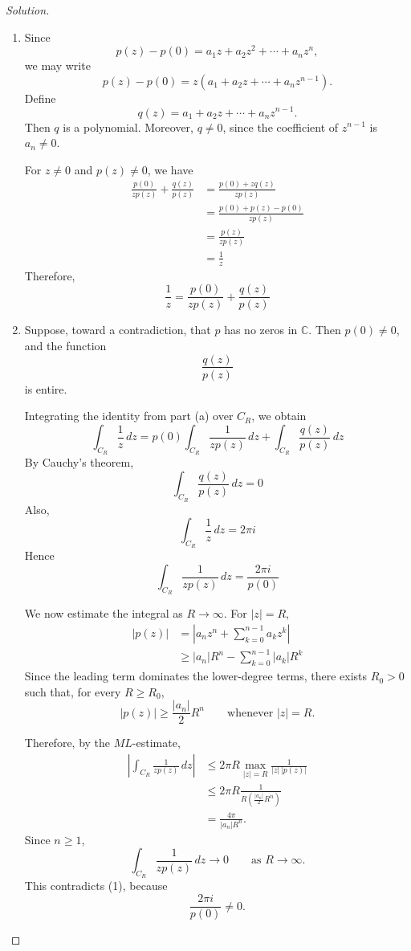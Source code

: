 \documentclass[12pt, a4paper]{report}
\theoremstyle{spaced}
\begin{document}
\begin{proof}[Solution]
	\begin{enumerate}
		\item[(a)]
			Since
			\[
				p(z)-p(0)
				=
				a_1z+a_2z^2+\cdots+a_nz^n,
			\]
			we may write
			\[
				p(z)-p(0)
				=
				z\left(a_1+a_2z+\cdots+a_nz^{n-1}\right).
			\]
			Define
			\[
				q(z)=a_1+a_2z+\cdots+a_nz^{n-1}.
			\]
			Then \(q\) is a polynomial. Moreover, \(q\neq 0\), since the
			coefficient of \(z^{n-1}\) is \(a_n\neq 0\).

			For \(z\neq 0\) and \(p(z)\neq 0\), we have
			\[
				\begin{aligned}
					\frac{p(0)}{zp(z)}+\frac{q(z)}{p(z)}
					 & =
					\frac{p(0)+zq(z)}{zp(z)}     \\
					 & =
					\frac{p(0)+p(z)-p(0)}{zp(z)} \\
					 & =
					\frac{p(z)}{zp(z)}           \\
					 & =
					\frac{1}{z}
				\end{aligned}
			\]
			Therefore,
			\[
				\frac{1}{z}
				=
				\frac{p(0)}{zp(z)}
				+
				\frac{q(z)}{p(z)}
			\]

		\item[(b)]
			Suppose, toward a contradiction, that \(p\) has no zeros in
			\(\mathbb{C}\). Then \(p(0)\neq 0\), and the function
			\[
				\frac{q(z)}{p(z)}
			\]
			is entire.

			Integrating the identity from part \textup{(a)} over \(C_R\), we obtain
			\[
				\int_{C_R}\frac{1}{z}\,dz
				=
				p(0)\int_{C_R}\frac{1}{zp(z)}\,dz
				+
				\int_{C_R}\frac{q(z)}{p(z)}\,dz
			\]
			By Cauchy's theorem,
			\[
				\int_{C_R}\frac{q(z)}{p(z)}\,dz=0
			\]
			Also,
			\[
				\int_{C_R}\frac{1}{z}\,dz=2\pi i
			\]
			Hence
			\[
				\int_{C_R}\frac{1}{zp(z)}\,dz
				=
				\frac{2\pi i}{p(0)}
				\tag{1}
			\]

			We now estimate the integral as \(R\to\infty\). For \(|z|=R\),
			\[
				\begin{aligned}
					|p(z)|
					 & =
					\left|a_nz^n+\sum_{k=0}^{n-1}a_kz^k\right| \\
					 & \geq
					|a_n|R^n-\sum_{k=0}^{n-1}|a_k|R^k
				\end{aligned}
			\]
			Since the leading term dominates the lower-degree terms, there exists
			\(R_0>0\) such that, for every \(R\geq R_0\),
			\[
				|p(z)|
				\geq
				\frac{|a_n|}{2}R^n
				\qquad\text{whenever }|z|=R.
			\]

			Therefore, by the \(ML\)-estimate,
			\[
				\begin{aligned}
					\left|
					\int_{C_R}\frac{1}{zp(z)}\,dz
					\right|
					 & \leq
					2\pi R
					\max_{|z|=R}\frac{1}{|z|\,|p(z)|} \\
					 & \leq
					2\pi R
					\frac{1}{
						R\left(\frac{|a_n|}{2}R^n\right)
					}                                 \\
					 & =
					\frac{4\pi}{|a_n|R^n}.
				\end{aligned}
			\]
			Since \(n\geq 1\),
			\[
				\int_{C_R}\frac{1}{zp(z)}\,dz
				\longrightarrow 0
				\qquad\text{as }R\to\infty.
			\]
			This contradicts \textup{(1)}, because
			\[
				\frac{2\pi i}{p(0)}\neq 0.
			\]


\end{enumerate}
\end{proof}
\end{document}
